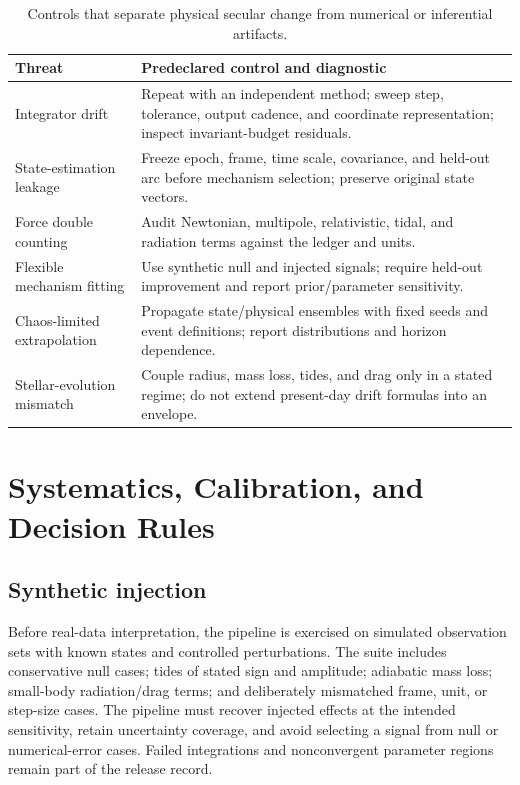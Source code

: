 \documentclass[10pt,conference]{IEEEtran}
\begin{document}
\begin{table}[!t]
\caption{Controls that separate physical secular change from numerical or inferential artifacts.}
\label{tab:controls}
\centering
\footnotesize
\setlength{\tabcolsep}{3pt}
\begin{tabular}{p{}p{}}
\toprule
Threat & Predeclared control and diagnostic \\
\midrule
Integrator drift & Repeat with an independent method; sweep step, tolerance, output cadence, and coordinate representation; inspect invariant-budget residuals. \\
State-estimation leakage & Freeze epoch, frame, time scale, covariance, and held-out arc before mechanism selection; preserve original state vectors. \\
Force double counting & Audit Newtonian, multipole, relativistic, tidal, and radiation terms against the ledger and units. \\
Flexible mechanism fitting & Use synthetic null and injected signals; require held-out improvement and report prior/parameter sensitivity. \\
Chaos-limited extrapolation & Propagate state/physical ensembles with fixed seeds and event definitions; report distributions and horizon dependence. \\
Stellar-evolution mismatch & Couple radius, mass loss, tides, and drag only in a stated regime; do not extend present-day drift formulas into an envelope. \\
\bottomrule
\end{tabular}
\end{table}

\section{Systematics, Calibration, and Decision Rules}
\label{sec:systematics}

\subsection{Synthetic injection}

Before real-data interpretation, the pipeline is exercised on simulated observation sets with known states and controlled perturbations. The suite includes conservative null cases; tides of stated sign and amplitude; adiabatic mass loss; small-body radiation/drag terms; and deliberately mismatched frame, unit, or step-size cases. The pipeline must recover injected effects at the intended sensitivity, retain uncertainty coverage, and avoid selecting a signal from null or numerical-error cases. Failed integrations and nonconvergent parameter regions remain part of the release record.
\end{document}

